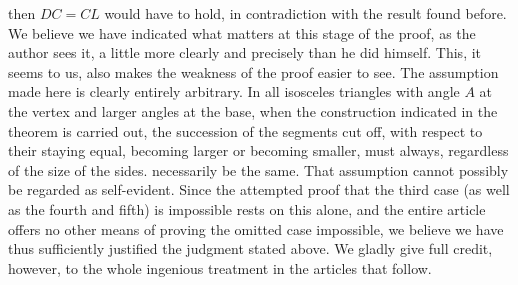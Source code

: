%
then \(DC=CL\) would have to hold, in contradiction with the result found before. We believe we have indicated what matters at this stage of the proof, as the author sees it, a little more clearly and precisely than he did himself. This, it seems to us, also makes the weakness of the proof easier to see. The assumption made here is clearly entirely arbitrary. In all isosceles triangles with angle \(A\) at the vertex and larger angles at the base, when the construction indicated in the theorem is carried out, the succession of the segments cut off, with respect to their staying equal, becoming larger or becoming smaller, must always, regardless of the size of the sides. necessarily be the same. That assumption cannot possibly be regarded as self-evident. Since the attempted proof that the third case (as well as the fourth and fifth) is impossible rests on this alone, and the entire article offers no other means of proving the omitted case impossible, we believe we have thus sufficiently justified the judgment stated above. We gladly give full credit, however, to the whole ingenious treatment in the articles that follow.

